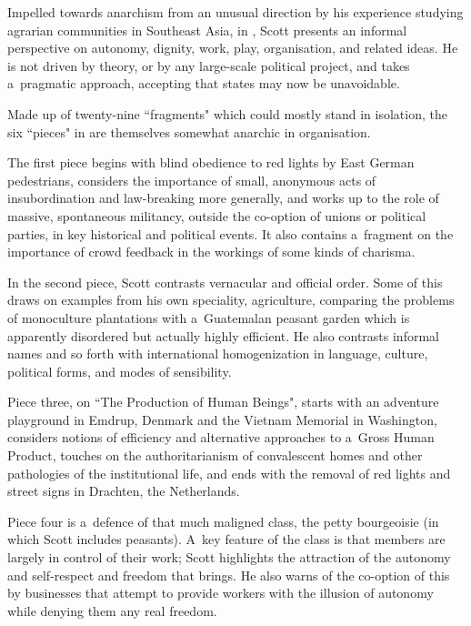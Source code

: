 \newpage\nuluj
\pagestyle{scott}


Impelled towards anarchism from an unusual direction by his experience studying agrarian communities in Southeast Asia, in , Scott presents an informal perspective on autonomy, dignity, work, play, organisation, and related ideas. He is not driven by theory, or by any large-scale political project, and takes a~pragmatic approach, accepting that states may now be unavoidable. 

Made up of twenty-nine ``fragments" which could mostly stand in isolation, the six ``pieces" in  are themselves somewhat anarchic in organisation. 

The first piece begins with blind obedience to red lights by East German pedestrians, considers the importance of small, anonymous acts of insubordination and law-breaking more generally, and works up to the role of massive, spontaneous militancy, outside the co-option of unions or political parties, in key historical and political events. It also contains a~fragment on the importance of crowd feedback in the workings of some kinds of charisma. 

In the second piece, Scott contrasts vernacular and official order. Some of this draws on examples from his own speciality, agriculture, comparing the problems of monoculture plantations with a~Guatemalan peasant garden which is apparently disordered but actually highly efficient. He also contrasts informal names and so forth with international homogenization in language, culture, political forms, and modes of sensibility. 

Piece three, on ``The Production of Human Beings", starts with an adventure playground in Emdrup, Denmark and the Vietnam Memorial in Washington, considers notions of efficiency and alternative approaches to a~Gross Human Product, touches on the authoritarianism of convalescent homes and other pathologies of the institutional life, and ends with the removal of red lights and street signs in Drachten, the Netherlands. 

Piece four is a~defence of that much maligned class, the petty bourgeoisie (in which Scott includes peasants). A~key feature of the class is that members are largely in control of their work; Scott highlights the attraction of the autonomy and self-respect and freedom that brings. He also warns of the co-option of this by businesses that attempt to provide workers with the illusion of autonomy while denying them any real freedom. 

